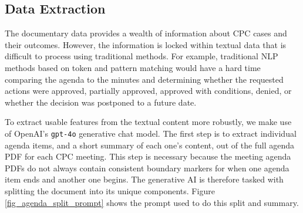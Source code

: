\subsection{Data Extraction}

The documentary data provides a wealth of information about CPC cases and their outcomes. However, the information is locked within textual data that is difficult to process using traditional methods. For example, traditional NLP methods based on token and pattern matching would have a hard time comparing the agenda to the minutes and determining whether the requested actions were approved, partially approved, approved with conditions, denied, or whether the decision was postponed to a future date. 

To extract usable features from the textual content more robustly, we make use of OpenAI's \texttt{gpt-4o} generative chat model. The first step is to extract individual agenda items, and a short summary of each one's content, out of the full agenda PDF for each CPC meeting. This step is necessary because the meeting agenda PDFs do not always contain consistent boundary markers for when one agenda item ends and another one begins. The generative AI is therefore tasked with splitting the document into its unique components. Figure \ref{fig_agenda_split_prompt} shows the prompt used to do this split and summary.




